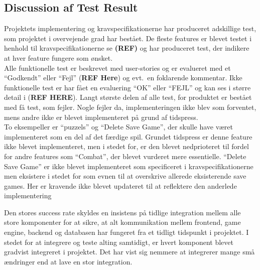 \subsection{Discussion af Test Result}
Projektets implementering og kravspecifikationerne har produceret adskillige test, som 
projektet i overvejende grad har bestået. De fleste features er blevet
testet i henhold til kravspecifikationerne se \textbf{(REF)} og har produceret 
test, der indikere at hver feature fungere som ønsket. \\

Alle funktionelle test er beskrevet med user-stories og er evalueret med et ``Godkendt''
eller ``Fejl'' (\textbf{REF Here}) og evt.\ en foklarende kommentar. Ikke funktionelle 
test er har fået en evaluering ``OK'' eller ``FEJL'' og kan ses i større detail i (\textbf{REF HERE}).
Langt største delen af alle test, for produktet er bestået med få test, som fejler. 
Nogle fejler da, implementeringen ikke blev som forventet, mens andre ikke er blevet 
implementeret på grund af tidspress. \\

To eksempeller er ``puzzels'' og ``Delete Save Game'', der skulle have været implementeret som en del af det færdige spil.
Grundet tidspress er denne feature ikke blevet implementeret, men i stedet for, er den blevet
nedprioteret til fordel for andre features som ``Combat'', der blevet vurderet mere essentielle.
``Delete Save Game'' er ikke blevet implementeret som specificeret i kravspecifikationerne men
eksistere i stedet for som evnen til at overskrive allerede eksisterende save games. Her er 
kravende ikke blevet updateret til at reflektere den anderlede implementering

Den stores success rate skyldes en insistens på tidlige integration mellem alle store komponenter for at sikre, at 
alt kommunikation mellem frontend, game engine, backend og databasen har fungeret fra et tidligt 
tidspunkt i projektet. I stedet for at integrere og teste alting samtidigt, er hvert komponent 
blevet gradvist integreret i projektet. Det har vist sig nemmere at integrerer mange små ændringer
end at lave en stor integration.




